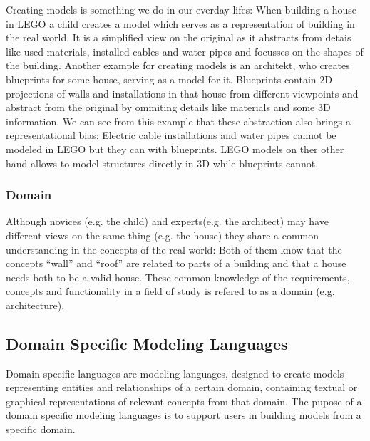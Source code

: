 \documentclass[runningheads,a4paper]{llncs}
\begin{document}
  Creating models is something we do in our everday lifes:
  When building a house in LEGO a child creates a model which serves as a representation of building in the real world.
  It is a simplified view on the original as it abstracts from detais like used materials, installed cables and water pipes and focusses
  on the shapes of the building.
  Another example for creating models is an architekt, who creates blueprints for some house, serving as a model for it.
  Blueprints contain 2D projections of walls and installations in that house from different viewpoints and abstract from the original by ommiting
  details like materials and some 3D information. 
  We can see from this example that these abstraction also brings a representational bias:
  Electric cable installations and water pipes cannot be modeled in LEGO but they can with blueprints.
  LEGO models on ther other hand allows to model structures directly in 3D while blueprints cannot.
  
\subsubsection{Domain}
  
  Although novices (e.g. the child) and experts(e.g. the architect) may have different views on the same thing (e.g. the house)
  they share a common understanding in the concepts of the real world: 
  Both of them know that the concepts ``wall'' and ``roof'' are related to parts of a building and that a house needs both to be a valid house.
  These common knowledge of the requirements, concepts and functionality in a field of study is refered to as a domain (e.g. architecture). 
  
  
 \subsection{Domain Specific Modeling Languages}
 Domain specific languages are modeling languages, designed to create models representing entities and relationships of a certain domain,
 containing textual or graphical representations of relevant concepts from that domain. The pupose of a domain specific modeling languages
 is to support users in building models from a specific domain.
 
\end{document}
